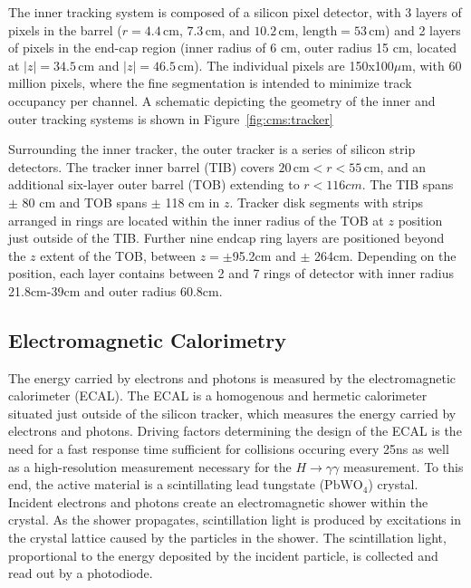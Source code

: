 The inner tracking system is composed of a silicon pixel detector, with 3 layers of pixels in the barrel ($r=4.4 \,\mathrm{cm}$, $7.3 \,\mathrm{cm}$, and $10.2 \,\mathrm{cm}$, $\mathrm{length}=53\,\mathrm{cm}$) and 2 layers of pixels in the end-cap region (inner radius of 6 cm, outer radius 15 cm, located at $|z|=34.5 \,\mathrm{cm}$ and $|z|= 46.5 \,\mathrm{cm}$). The individual pixels are 150x100$\mu\mathrm{m}$, with 60 million pixels, where the fine segmentation is intended to minimize track occupancy per channel. A schematic depicting the geometry of the inner and outer tracking systems is shown in Figure~\ref{fig:cms:tracker}


Surrounding the inner tracker, the outer tracker is a series of silicon strip detectors. The tracker inner barrel (TIB) covers $20 \,\mathrm{cm} < r < 55 \,\mathrm{cm}$, and an additional six-layer outer barrel (TOB) extending to $r<116cm$.  The TIB spans $\pm$ 80 cm and TOB spans $\pm$ 118 cm in $z$. 
Tracker disk segments with strips arranged in rings are located within the inner radius of the TOB at $z$ position just outside of the TIB. Further nine endcap ring layers are positioned beyond the $z$ extent of the TOB, between $z=\pm$95.2cm and $\pm$ 264cm. Depending on the position, each layer contains between 2 and 7 rings of detector with inner radius 21.8cm-39cm and outer radius 60.8cm.




\subsection{Electromagnetic Calorimetry}\label{ch:cms:ecal}
The energy carried by electrons and photons is measured by the electromagnetic calorimeter (ECAL). The ECAL is a homogenous and hermetic calorimeter situated just outside of the silicon tracker, which measures the energy carried by electrons and photons.
Driving factors determining the design of the ECAL is the need for a fast response time sufficient for collisions occuring every 25ns as well as a high-resolution measurement necessary for the $H\rightarrow \gamma \gamma$ measurement. To this end, the active material is a scintillating lead tungstate ($\mathrm{PbWO_4}$) crystal. Incident electrons and photons create an electromagnetic shower within the crystal. As the shower propagates, scintillation light is produced by excitations in the crystal lattice caused by the particles in the shower. The scintillation light, proportional to the energy deposited by the incident particle, is collected and read out by a photodiode\cite{CERN-LHCC-97-033}.

